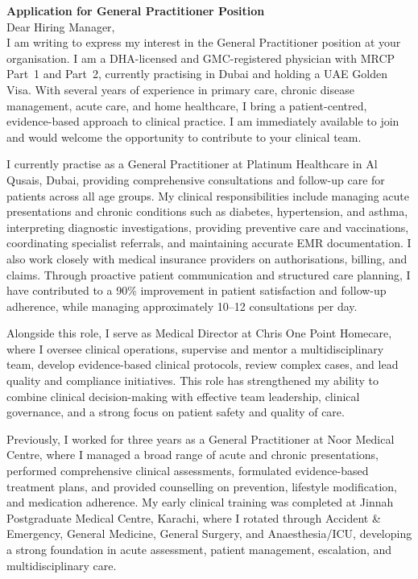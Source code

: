 \documentclass[a4paper,10pt]{article}
\begin{document}
\thispagestyle{empty}

\textbf{Application for General Practitioner Position}\\[0.5em]

Dear Hiring Manager,\\[0.2em]

I am writing to express my interest in the General Practitioner position at your organisation. I am a DHA-licensed and GMC-registered physician with MRCP Part~1 and Part~2, currently practising in Dubai and holding a UAE Golden Visa. With several years of experience in primary care, chronic disease management, acute care, and home healthcare, I bring a patient-centred, evidence-based approach to clinical practice. I am immediately available to join and would welcome the opportunity to contribute to your clinical team.

I currently practise as a General Practitioner at Platinum Healthcare in Al Qusais, Dubai, providing comprehensive consultations and follow-up care for patients across all age groups. My clinical responsibilities include managing acute presentations and chronic conditions such as diabetes, hypertension, and asthma, interpreting diagnostic investigations, providing preventive care and vaccinations, coordinating specialist referrals, and maintaining accurate EMR documentation. I also work closely with medical insurance providers on authorisations, billing, and claims. Through proactive patient communication and structured care planning, I have contributed to a 90\% improvement in patient satisfaction and follow-up adherence, while managing approximately 10--12 consultations per day.

Alongside this role, I serve as Medical Director at Chris One Point Homecare, where I oversee clinical operations, supervise and mentor a multidisciplinary team, develop evidence-based clinical protocols, review complex cases, and lead quality and compliance initiatives. This role has strengthened my ability to combine clinical decision-making with effective team leadership, clinical governance, and a strong focus on patient safety and quality of care.

Previously, I worked for three years as a General Practitioner at Noor Medical Centre, where I managed a broad range of acute and chronic presentations, performed comprehensive clinical assessments, formulated evidence-based treatment plans, and provided counselling on prevention, lifestyle modification, and medication adherence. My early clinical training was completed at Jinnah Postgraduate Medical Centre, Karachi, where I rotated through Accident \& Emergency, General Medicine, General Surgery, and Anaesthesia/ICU, developing a strong foundation in acute assessment, patient management, escalation, and multidisciplinary care.
\end{document}

